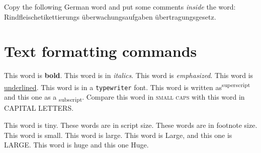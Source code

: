 \documentclass[10pt, paper=a4, abstracton]{scrartcl}
\begin{document}
Copy the following German word and put some comments \textit{inside} the word:
Rindfleischetikettierungs%
überwachungsaufgaben%
übertragungsgesetz. 


\section{Text formatting commands}


This word is \textbf{bold}. This word is in \textit{italics}. This word is \emph{emphasized}. This word is \underline{underlined}. This word is in a \texttt{typewriter} font. This word is written as\textsuperscript{superscript} and this one as a \textsubscript{subscript}. Compare this word in \textsc{small caps} with this word in CAPITAL LETTERS. 

This word is {\tiny tiny}. These words are in {\scriptsize script size}. These words are in {\footnotesize footnote size}. This word is {\small small}. This word is {\large large}. This word is {\Large Large}, and this one is {\LARGE LARGE}. This word is {\huge huge} and this one {\Huge Huge}.
\end{document}
